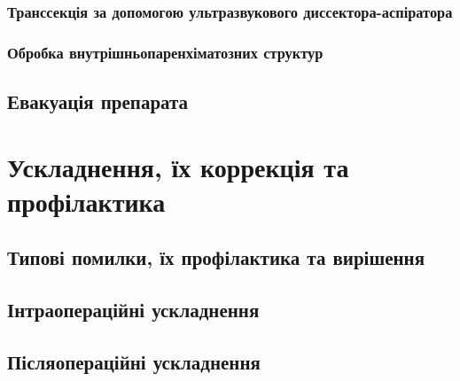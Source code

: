 \begin{refsection}
\subsubsection{Транссекція за допомогою ультразвукового диссектора-аспіратора}

\subsubsection{Обробка внутрішньопаренхіматозних структур}

\subsection{Евакуація препарата}

\section{Ускладнення, їх коррекція та профілактика}

\subsection{Типові помилки, їх профілактика та вирішення}

\subsection{Інтраопераційні ускладнення}

\subsection{Післяопераційні ускладнення}

\printbibliography [heading=subbibliography]
\end{refsection}